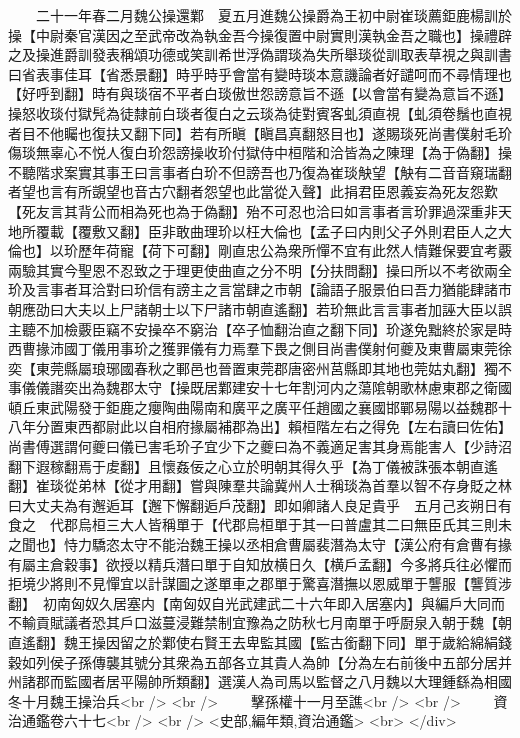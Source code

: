 　　二十一年春二月魏公操還鄴　夏五月進魏公操爵為王初中尉崔琰薦鉅鹿楊訓於操【中尉秦官漢因之至武帝改為執金吾今操復置中尉實則漢執金吾之職也】操禮辟之及操進爵訓發表稱頌功德或笑訓希世浮偽謂琰為失所舉琰從訓取表草視之與訓書曰省表事佳耳【省悉景翻】時乎時乎會當有變時琰本意譏論者好譴呵而不尋情理也【好呼到翻】時有與琰宿不平者白琰傲世怨謗意旨不遜【以會當有變為意旨不遜】操怒收琰付獄髠為徒隸前白琰者復白之云琰為徒對賓客虬須直視【虬須卷鬚也直視者目不他矚也復扶又翻下同】若有所瞋【瞋昌真翻怒目也】遂賜琰死尚書僕射毛玠傷琰無辜心不悦人復白玠怨謗操收玠付獄侍中桓階和洽皆為之陳理【為于偽翻】操不聽階求案實其事王曰言事者白玠不但謗吾也乃復為崔琰觖望【觖有二音音窺瑞翻者望也言有所覬望也音古穴翻者怨望也此當從入聲】此捐君臣恩義妄為死友怨歎【死友言其背公而相為死也為于偽翻】殆不可忍也洽曰如言事者言玠罪過深重非天地所覆載【覆敷又翻】臣非敢曲理玠以枉大倫也【孟子曰内則父子外則君臣人之大倫也】以玠歷年荷寵【荷下可翻】剛直忠公為衆所憚不宜有此然人情難保要宜考覈兩驗其實今聖恩不忍致之于理更使曲直之分不明【分扶問翻】操曰所以不考欲兩全玠及言事者耳洽對曰玠信有謗主之言當肆之市朝【論語子服景伯曰吾力猶能肆諸市朝應劭曰大夫以上尸諸朝士以下尸諸市朝直遙翻】若玠無此言言事者加誣大臣以誤主聽不加檢覈臣竊不安操卒不窮治【卒子恤翻治直之翻下同】玠遂免黜終於家是時西曹掾沛國丁儀用事玠之獲罪儀有力焉羣下畏之側目尚書僕射何夔及東曹屬東莞徐奕【東莞縣屬琅琊國春秋之鄆邑也晉置東莞郡唐密州莒縣即其地也莞姑丸翻】獨不事儀儀譖奕出為魏郡太守【操既居鄴建安十七年割河内之蕩隂朝歌林慮東郡之衛國頓丘東武陽發于鉅鹿之癭陶曲陽南和廣平之廣平任趙國之襄國邯鄲易陽以益魏郡十八年分置東西都尉此以自相府掾屬補郡為出】賴桓階左右之得免【左右讀曰佐佑】尚書傅選謂何夔曰儀已害毛玠子宜少下之夔曰為不義適足害其身焉能害人【少詩沼翻下遐稼翻焉于䖍翻】且懷姦佞之心立於明朝其得久乎【為丁儀被誅張本朝直遙翻】崔琰從弟林【從才用翻】嘗與陳羣共論冀州人士稱琰為首羣以智不存身貶之林曰大丈夫為有邂逅耳【邂下懈翻逅戶茂翻】即如卿諸人良足貴乎　五月己亥朔日有食之　代郡烏桓三大人皆稱單于【代郡烏桓單于其一曰普盧其二曰無臣氏其三則未之聞也】恃力驕恣太守不能治魏王操以丞相倉曹屬裴潛為太守【漢公府有倉曹有掾有屬主倉穀事】欲授以精兵潛曰單于自知放横日久【横戶孟翻】今多將兵往必懼而拒境少將則不見憚宜以計謀圖之遂單車之郡單于驚喜潛撫以恩威單于讋服【讋質涉翻】　初南匈奴久居塞内【南匈奴自光武建武二十六年即入居塞内】與編戶大同而不輸貢賦議者恐其戶口滋蔓浸難禁制宜豫為之防秋七月南單于呼㕑泉入朝于魏【朝直遙翻】魏王操因留之於鄴使右賢王去卑監其國【監古銜翻下同】單于歲給綿絹錢穀如列侯子孫傳襲其號分其衆為五部各立其貴人為帥【分為左右前後中五部分居并州諸郡而監國者居平陽帥所類翻】選漢人為司馬以監督之八月魏以大理鍾繇為相國　冬十月魏王操治兵<br />
<br />
　　擊孫權十一月至譙<br />
<br />
　　資治通鑑卷六十七<br />
<br />
<史部,編年類,資治通鑑>  <br>
   </div> 

